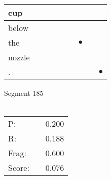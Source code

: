 \documentclass[landscape]{article}
\newcommand{\ssp}{\hspace{2pt}}
\newcommand{\mex}{\cellcolor{g}$\bullet$}
\begin{document}
\begin{tabular}{|l|p{10pt}|p{10pt}|p{10pt}|p{10pt}|p{10pt}|p{10pt}|p{10pt}|p{10pt}|}
\hline
\ssp cup \ssp&\hspace{2pt}&\hspace{2pt}&\hspace{2pt}&\hspace{2pt}&\hspace{2pt}&\hspace{2pt}&\hspace{2pt}&\hspace{2pt}\\
\hline
\ssp below \ssp&\hspace{2pt}&\hspace{2pt}&\hspace{2pt}&\hspace{2pt}&\hspace{2pt}&\hspace{2pt}&\hspace{2pt}&\hspace{2pt}\\
\hline
\ssp \cellcolor{ref5}the \ssp&\hspace{2pt}&\hspace{2pt}&\hspace{2pt}&\hspace{2pt}&\hspace{2pt}&\hspace{2pt}\mex&\hspace{2pt}&\hspace{2pt}\\
\hline
\ssp nozzle \ssp&\hspace{2pt}&\hspace{2pt}&\hspace{2pt}&\hspace{2pt}&\hspace{2pt}&\hspace{2pt}&\hspace{2pt}&\hspace{2pt}\\
\hline
\ssp \cellcolor{ref7}. \ssp&\hspace{2pt}&\hspace{2pt}&\hspace{2pt}&\hspace{2pt}&\hspace{2pt}&\hspace{2pt}&\hspace{2pt}&\hspace{2pt}\mex\\
\hline
\end{tabular}

\vspace{6pt}
\noindent Segment 185\\\\
\noindent\begin{tabular}{lm{12pt}r}
\hline
P:&&0.200\\
R:&&0.188\\
Frag:&&0.600\\
Score:&&0.076\\
\end{tabular}
\end{document}
